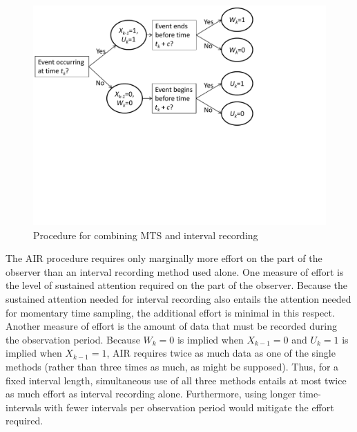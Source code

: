 \documentclass[man, noextraspace, floatsintext]{apa6}\usepackage[]{graphicx}\usepackage[]{color}
\begin{document}
\begin{figure}[tbp]
\centering
\includegraphics[clip=true, trim= 0 240 150 00, width=0.8\linewidth]{ppt/AIR_flowchart.pdf}
\caption{Procedure for combining MTS and interval recording}
\label{fig:questions}
\end{figure}  

The AIR procedure requires only marginally more effort on the part of the observer than an interval recording method used alone. 
One measure of effort is the level of sustained attention required on the part of the observer. Because the sustained attention needed for interval recording also entails the attention needed for momentary time sampling, the additional effort is minimal in this respect.
Another measure of effort is the amount of data that must be recorded during the observation period. Because $W_k = 0$ is implied when $X_{k-1} = 0$ and $U_k = 1$ is implied when $X_{k-1} = 1$, AIR requires twice as much data as one of the single methods (rather than three times as much, as might be supposed). 
Thus, for a fixed interval length, simultaneous use of all three methods entails at most twice as much effort as interval recording alone. 
Furthermore, using longer time-intervals with fewer intervals per observation period would mitigate the effort required. 
\end{document}
